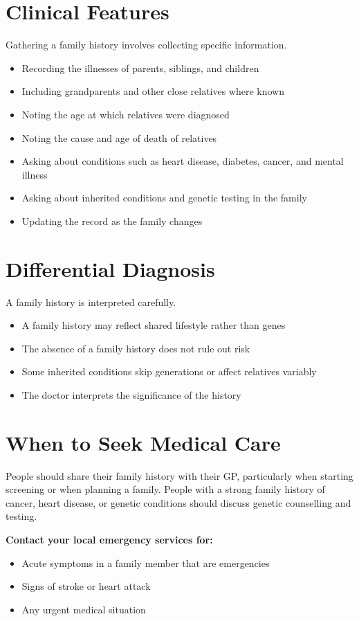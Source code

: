 \section*{Clinical Features}
Gathering a family history involves collecting specific information.
\begin{itemize}
    \item Recording the illnesses of parents, siblings, and children
    \item Including grandparents and other close relatives where known
    \item Noting the age at which relatives were diagnosed
    \item Noting the cause and age of death of relatives
    \item Asking about conditions such as heart disease, diabetes, cancer, and mental illness
    \item Asking about inherited conditions and genetic testing in the family
    \item Updating the record as the family changes
\end{itemize}

\section*{Differential Diagnosis}
A family history is interpreted carefully.
\begin{itemize}
    \item A family history may reflect shared lifestyle rather than genes
    \item The absence of a family history does not rule out risk
    \item Some inherited conditions skip generations or affect relatives variably
    \item The doctor interprets the significance of the history
\end{itemize}

\section*{When to Seek Medical Care}
People should share their family history with their GP, particularly when starting screening or when planning a family. People with a strong family history of cancer, heart disease, or genetic conditions should discuss genetic counselling and testing.

\textbf{Contact your local emergency services for:}
\begin{itemize}
    \item Acute symptoms in a family member that are emergencies
    \item Signs of stroke or heart attack
    \item Any urgent medical situation
\end{itemize}

